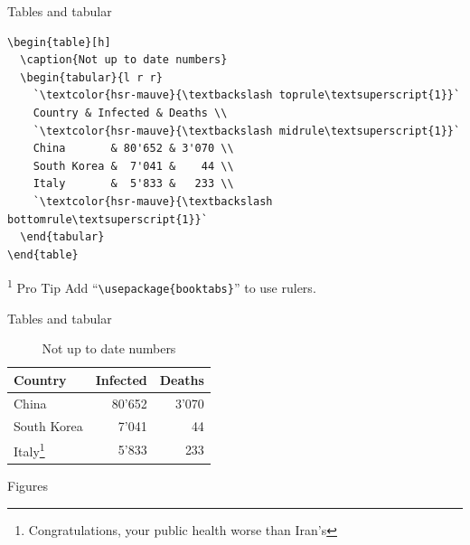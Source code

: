 \documentclass[xetex, onlymath]{beamer}
\begin{document}
\begin{frame}[fragile]{Tables and tabular}
\begin{lstlisting}
\begin{table}[h]
  \caption{Not up to date numbers}
  \begin{tabular}{l r r}
    `\textcolor{hsr-mauve}{\textbackslash toprule\textsuperscript{1}}`
    Country & Infected & Deaths \\
    `\textcolor{hsr-mauve}{\textbackslash midrule\textsuperscript{1}}`
    China       & 80'652 & 3'070 \\
    South Korea &  7'041 &    44 \\
    Italy       &  5'833 &   233 \\
    `\textcolor{hsr-mauve}{\textbackslash bottomrule\textsuperscript{1}}`
  \end{tabular}
\end{table}
\end{lstlisting}
\begin{alertblock}{\textsuperscript{1} Pro Tip}
	Add ``\texttt{\textbackslash usepackage\{booktabs\}}'' to use
	rulers.
\end{alertblock}
\end{frame}

\begin{frame}{Tables and tabular}
\begin{exampleblock}{}
\begin{table}
  \caption{Not up to date numbers}
  \begin{tabular}{l r r}
    \toprule
    Country & Infected & Deaths \\
    \midrule
    China       & 80'652 & 3'070 \\
    South Korea &  7'041 &    44 \\
    Italy\footnote{Congratulations, your public health worse than Iran's}
    &  5'833 &   233 \\
    \bottomrule
  \end{tabular}
\end{table}
\end{exampleblock}
\end{frame}


\begin{frame}{Figures}
\end{frame}
\end{document}
